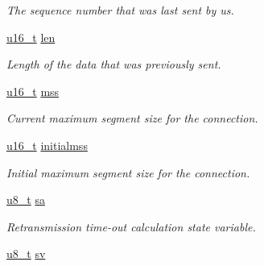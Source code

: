 \begin{CompactItemize}
\begin{CompactList}\small\item\em The sequence number that was last sent by us. \item\end{CompactList}\item 
\hypertarget{a00028_0ef3ae2764714bf90620075c374c262e}{
\hyperlink{a00070_gfc6499c1f28697aa3bfc2804d496fd11}{u16\_\-t} \hyperlink{a00028_0ef3ae2764714bf90620075c374c262e}{len}}
\label{a00028_0ef3ae2764714bf90620075c374c262e}

\begin{CompactList}\small\item\em Length of the data that was previously sent. \item\end{CompactList}\item 
\hypertarget{a00028_3347ef1b6e8581402445d1a0280c7a14}{
\hyperlink{a00070_gfc6499c1f28697aa3bfc2804d496fd11}{u16\_\-t} \hyperlink{a00028_3347ef1b6e8581402445d1a0280c7a14}{mss}}
\label{a00028_3347ef1b6e8581402445d1a0280c7a14}

\begin{CompactList}\small\item\em Current maximum segment size for the connection. \item\end{CompactList}\item 
\hypertarget{a00028_db7a3fadb68df5fdd37e8b91a2c751ea}{
\hyperlink{a00070_gfc6499c1f28697aa3bfc2804d496fd11}{u16\_\-t} \hyperlink{a00028_db7a3fadb68df5fdd37e8b91a2c751ea}{initialmss}}
\label{a00028_db7a3fadb68df5fdd37e8b91a2c751ea}

\begin{CompactList}\small\item\em Initial maximum segment size for the connection. \item\end{CompactList}\item 
\hypertarget{a00028_ef661afb3aa82f0437d2ed8d3c20be76}{
\hyperlink{a00070_ge081489b4906f65a3cb18e9fbe9f8d23}{u8\_\-t} \hyperlink{a00028_ef661afb3aa82f0437d2ed8d3c20be76}{sa}}
\label{a00028_ef661afb3aa82f0437d2ed8d3c20be76}

\begin{CompactList}\small\item\em Retransmission time-out calculation state variable. \item\end{CompactList}\item 
\hypertarget{a00028_eb9fcbd3c9b0a795dcd63f33c323d65c}{
\hyperlink{a00070_ge081489b4906f65a3cb18e9fbe9f8d23}{u8\_\-t} \hyperlink{a00028_eb9fcbd3c9b0a795dcd63f33c323d65c}{sv}}
\label{a00028_eb9fcbd3c9b0a795dcd63f33c323d65c}


\end{CompactItemize}
